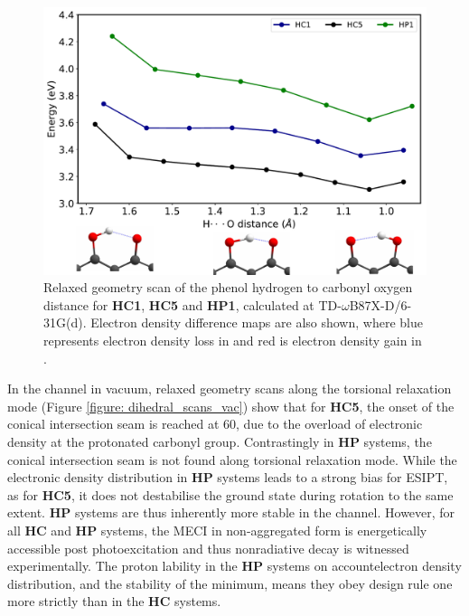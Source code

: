 \begin{figure}[t]
\centering
  \includegraphics[width=0.8\linewidth]{5ConnectingCrystalStructure/Hscan}
  \caption[Relaxed geometry scan for ESIPT process.]{Relaxed geometry scan of the phenol hydrogen to carbonyl oxygen distance for \textbf{HC1}, \textbf{HC5} and \textbf{HP1}, calculated at TD-$\omega$B87X-D/6-31G(d). Electron density difference maps are also shown, where blue represents electron density loss in \szero{} and red is electron density gain in \sone{}.}
  \label{figure: Hscan}
\end{figure}

In the \Kstar{} channel in vacuum, relaxed geometry scans along the torsional relaxation mode (Figure \ref{figure: dihedral_scans_vac}) show that for \textbf{HC5}, the onset of the conical intersection seam is reached at 60\degree, due to the overload of electronic density at the protonated carbonyl group. Contrastingly in \textbf{HP} systems, the conical intersection seam is not found along torsional relaxation mode. While the electronic density distribution in \textbf{HP} systems leads to a strong bias for ESIPT, as for \textbf{HC5}, it does not destabilise the ground state during rotation to the same extent. \textbf{HP} systems are thus inherently more stable in the \Kstar{} channel. However, for all \textbf{HC} and \textbf{HP} systems, the MECI in non-aggregated form is energetically accessible post photoexcitation and thus nonradiative decay is witnessed experimentally. The proton lability in the \textbf{HP} systems on accountelectron density distribution, and the stability of the \Kstar{} minimum, means they obey design rule one more strictly than in the \textbf{HC} systems. 

